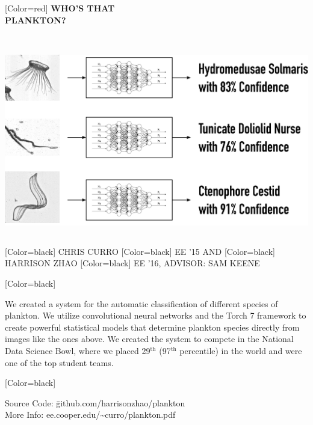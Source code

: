 \documentclass{article}
\begin{document}
\begin{minipage}[c]{20in}
{ 
[Color=red]
\fontsize{4in}{0.8in}\selectfont 
\bfseries
WHO'S THAT \vspace{0in}\\ PLANKTON?
}
\end{minipage}
\vspace{1in}\\
\colorbox{white}{
\begin{minipage}{28in}
\centering
\includegraphics[width=25in]{figure.pdf}
\end{minipage}
}
\vspace{1in}\\
{
[Color=black]
\fontsize{1in}{1em}\selectfont 
CHRIS CURRO
}
{
[Color=black]
\fontsize{0.8in}{1em}\selectfont 
EE '15 AND
}
{
[Color=black]
\fontsize{1in}{1em}\selectfont 
HARRISON ZHAO
}
{
[Color=black]
\fontsize{0.8in}{1em}\selectfont 
EE '16, ADVISOR: SAM KEENE
}
\vspace{0.8in}\\
\begin{minipage}{16.8in}
{
	[Color=black]
	\fontsize{0.6in}{8em}\selectfont

    We created a system for the automatic classification of different species
	of plankton. We utilize convolutional neural networks and the Torch 7 framework
	to create powerful statistical models that determine plankton species directly from
	images like the ones above. We created the system to compete in the National Data Science Bowl, 
	where we placed 29$^\text{th}$ (97$^\text{th}$ percentile) in the world and were one of the
	top student teams.


} \end{minipage} 
\hfill
\begin{minipage}{11in}
{
	[Color=black]
	\fontsize{0.6in}{8em}\selectfont
	\begin{tabbing}
	Source Code: \= github.com/harrisonzhao/plankton \\
	More Info: \> ee.cooper.edu/\textasciitilde{}curro/plankton.pdf
	\end{tabbing}
} \end{minipage} 
\end{document}
